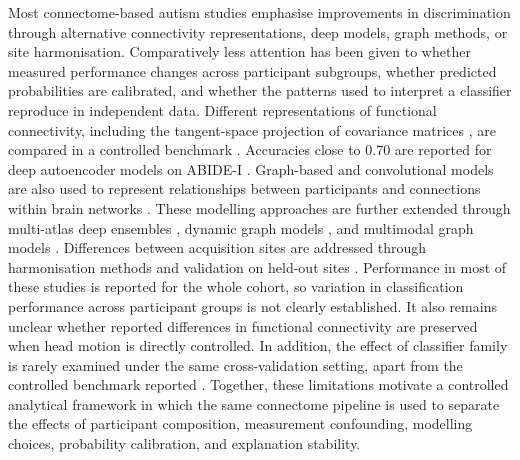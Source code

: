 Most connectome-based autism studies emphasise improvements in discrimination through alternative connectivity representations, deep models, graph methods, or site harmonisation. Comparatively less attention has been given to whether measured performance changes across participant subgroups, whether predicted probabilities are calibrated, and whether the patterns used to interpret a classifier reproduce in independent data. Different representations of functional connectivity, including the tangent-space projection of covariance matrices \citep{Varoquauxetal2010}, are compared in a controlled benchmark \citep{Dadietal2019}. Accuracies close to 0.70 are reported for deep autoencoder models on ABIDE-I \citep{Heinsfeldetal2018,Eslamietal2019,AlmuqhimSaeed2021}. Graph-based and convolutional models are also used to represent relationships between participants \citep{Parisotetal2018} and connections within brain networks \citep{Kawaharaetal2017}. These modelling approaches are further extended through multi-atlas deep ensembles \citep{Liuetal2024MADE}, dynamic graph models \citep{Tangetal2025GNNLSTM}, and multimodal graph models \citep{Tangetal2026CASGNN}. Differences between acquisition sites are addressed through harmonisation methods \citep{Johnsonetal2007,Fortinetal2018} and validation on held-out sites \citep{Abrahametal2017}. Performance in most of these studies is reported for the whole cohort, so variation in classification performance across participant groups is not clearly established. It also remains unclear whether reported differences in functional connectivity are preserved when head motion is directly controlled. In addition, the effect of classifier family is rarely examined under the same cross-validation setting, apart from the controlled benchmark reported \citep{Dadietal2019}. Together, these limitations motivate a controlled analytical framework in which the same connectome pipeline is used to separate the effects of participant composition, measurement confounding, modelling choices, probability calibration, and explanation stability.

